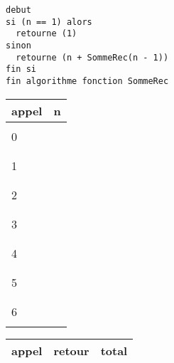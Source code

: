 \documentclass[11pt,a4paper]{article}
\begin{document}
\begin{table}[!ht]
\begin{minipage}{0.45\textwidth}
\begin{lstlisting}[style=algorithmique]
debut
si (n == 1) alors
  retourne (1)
sinon
  retourne (n + SommeRec(n - 1))
fin si
fin algorithme fonction SommeRec \end{lstlisting}
  \end{minipage}
  \hfillx
  \begin{minipage}{0.19\textwidth}
    \centering
    \begin{tabular}{|C{1.1cm}|C{1.1cm}|}
        \hline
        appel &  n  \\
        \hline
              &     \\
        0     &     \\
              &     \\
        \hline
              &     \\
        1     &     \\
              &     \\
        \hline
              &     \\
        2     &     \\
              &     \\
        \hline
              &     \\
        3     &     \\
              &     \\
        \hline
              &     \\
        4     &     \\
              &     \\
        \hline
              &     \\
        5     &     \\
              &     \\
        \hline
              &     \\
        6     &     \\
              &     \\
        \hline
    \end{tabular}
  \end{minipage}
  \hfillx
  \begin{minipage}{0.28\textwidth}
    \centering
    \begin{tabular}{|C{1.1cm}|C{1.1cm}|C{1.1cm}|}
        \hline
        appel & retour & total \\
        \hline

\end{tabular}
\end{minipage}
\end{table}
\end{document}
